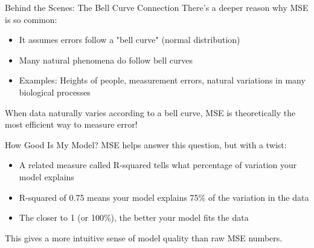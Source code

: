 \documentclass{beamer}
\begin{document}
\begin{frame}{Behind the Scenes: The Bell Curve Connection}
  There's a deeper reason why MSE is so common:
  
  \begin{itemize}
    \item It assumes errors follow a "bell curve" (normal distribution)
    \item Many natural phenomena do follow bell curves
    \item Examples: Heights of people, measurement errors, natural variations in many biological processes
  \end{itemize}
  
  \vspace{0.5cm}
  
  When data naturally varies according to a bell curve, MSE is theoretically the most efficient way to measure error!
\end{frame}

\begin{frame}{How Good Is My Model?}
  MSE helps answer this question, but with a twist:
  
  \begin{itemize}
    \item A related measure called R-squared tells what percentage of variation your model explains
    \item R-squared of 0.75 means your model explains 75\% of the variation in the data
    \item The closer to 1 (or 100\%), the better your model fits the data
  \end{itemize}
  
  \vspace{0.5cm}
  
  This gives a more intuitive sense of model quality than raw MSE numbers.
\end{frame}
\end{document}
